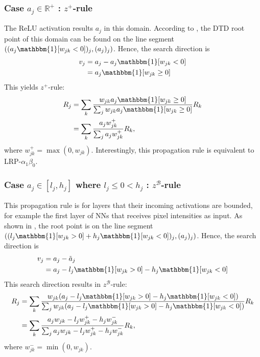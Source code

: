 \subsubsection{Case $a_j \in \mathbb{R}^+$ : $z^+$-rule}

The ReLU activation results $a_j$ in this domain. According to \addfigure{\ref{fig:dtd_zplus}}, the DTD root point of this domain can be found on the line segment  $( (a_j \mathbbm{1}[ w_{jk}  < 0 ])_j, (a_j)_j )$. Hence, the search direction is 
\begin{align*}
	v_j &= a_j - a_j \mathbbm{1}[ w_{jk}  < 0 ] \\
	&= a_j \mathbbm{1}[ w_{jk}  \ge 0 ]
\end{align*}
This yields $z^+$-rule:
\begin{align*}
		R_j &=	\sum_k \frac{ w_{jk} a_j \mathbbm{1}[w_{jk}  \ge 0 ]  }{\sum_{j} w_{jk} a_j \mathbbm{1}[ w_{jk}  \ge 0 ]}  R_k\\
		&=	\sum_k  \frac{ a_j  w_{jk}^+   }{\sum_{j}  a_j w_{jk}^+  }R_k,
\end{align*}
where $w_{jk}^+= \max(0, w_{jk})$. Interestingly, this propagation rule is equivalent to LRP-$\alpha_1\beta_0$. 


\subsubsection{Case $a_j \in [l_j , h_j]$ where $l_j \le 0 < h_j $ : $z^\mathcal{B}$-rule}

This propagation rule is for layers that their incoming activations are bounded, for example the first layer of NNs that receives pixel intensities as input. As shown in \addfigure{\ref{fig:dtd_zbeta}}, the root point is on the line segment $( (l_j \mathbbm{1}[ w_{jk}  > 0 ]  + h_j \mathbbm{1}[ w_{jk}  < 0 ])_j  , (a_j)_j ) $. Hence,  the search direction is 
\begin{align*}
	v_j &= a_j - \tilde{a}_j \\
	&=a_j  - l_j \mathbbm{1}[ w_{jk}  > 0 ]  - h_j \mathbbm{1}[ w_{jk}  < 0 ]
\end{align*}
This search direction results in  $z^\mathcal{B}$-rule:
\begin{align*}
		R_j &=	\sum_k \frac{ w_{jk}  (a_j  - l_j \mathbbm{1}[ w_{jk}  > 0 ]  - h_j \mathbbm{1}[ w_{jk}  < 0 ]) }{\sum_{j} w_{jk}  (a_j  - l_j \mathbbm{1}[ w_{jk}  > 0 ] - h_j \mathbbm{1}[ w_{jk}  < 0 ]) }  R_k\\
		&=	\sum_k  \frac{ a_j  w_{jk} - l_j w_{jk}^+ - h_j w_{jk}^-  }{\sum_{j}   a_j  w_{jk} - l_j w_{jk}^+ - h_j w_{jk}^- }  R_k,
\end{align*}
where $w_{jk}^- = \min(0, w_{jk})$.

